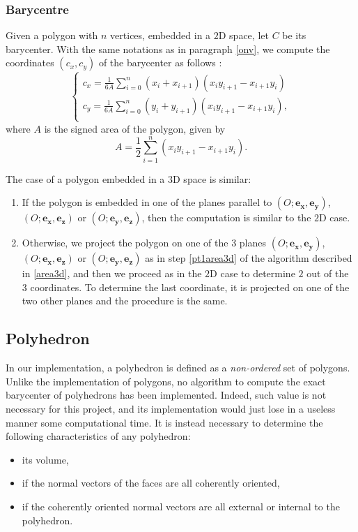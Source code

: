 \subsubsection{Barycentre}
Given a polygon with $n$ vertices, embedded in a $2$D space, let $C$ be its barycenter. With the same notations as in paragraph \ref{onv}, we compute the coordinates $(c_x,c_y)$ of the barycenter as follows \cite{bourke1988calculating}:
$$
\begin{cases}
c_x=\frac{1}{6A}\sum_{i=0}^{n} (x_i+x_{i+1})(x_iy_{i+1}-x_{i+1}y_i) \\
c_y=\frac{1}{6A}\sum_{i=0}^{n} (y_i+y_{i+1})(x_iy_{i+1}-x_{i+1}y_i), \\
\end{cases}
$$
where $A$ is the signed area of the polygon, given by
$$A=\frac{1}{2} \sum_{i=1}^n (x_iy_{i+1}-x_{i+1}y_i). $$

\noindent The case of a polygon embedded in a $3$D space is similar:
\begin{enumerate}
\item If the polygon is embedded in one of the planes parallel to $(O;\mathbf{e_x},\mathbf{e_y})$, $(O;\mathbf{e_x},\mathbf{e_z})$ or $(O;\mathbf{e_y},\mathbf{e_z})$, then the computation is similar to the $2$D case. 
\item Otherwise, we project the polygon on one of the $3$ planes $(O;\mathbf{e_x},\mathbf{e_y})$, $(O;\mathbf{e_x},\mathbf{e_z})$ or $(O;\mathbf{e_y},\mathbf{e_z})$ as in step \ref{pt1area3d} of the algorithm described in \ref{area3d}, and then we proceed as in the $2$D case to determine $2$ out of the $3$ coordinates. To determine the last coordinate, it is projected on one of the two other planes and the procedure is the same. 
\end{enumerate}

\subsection{Polyhedron} \label{polyhedron}
In our implementation, a polyhedron is defined as a \textit{non-ordered} set of polygons. Unlike the implementation of polygons, no algorithm to compute the exact barycenter of polyhedrons has been implemented. Indeed, such value is not necessary for this project, and its implementation would just lose in a useless manner some computational time. It is instead necessary to determine the following characteristics of any polyhedron:
\begin{itemize}
\item its volume, 
\item if the normal vectors of the faces are all coherently oriented, 
\item if the coherently oriented normal vectors are all external or internal to the polyhedron. 
\end{itemize}

